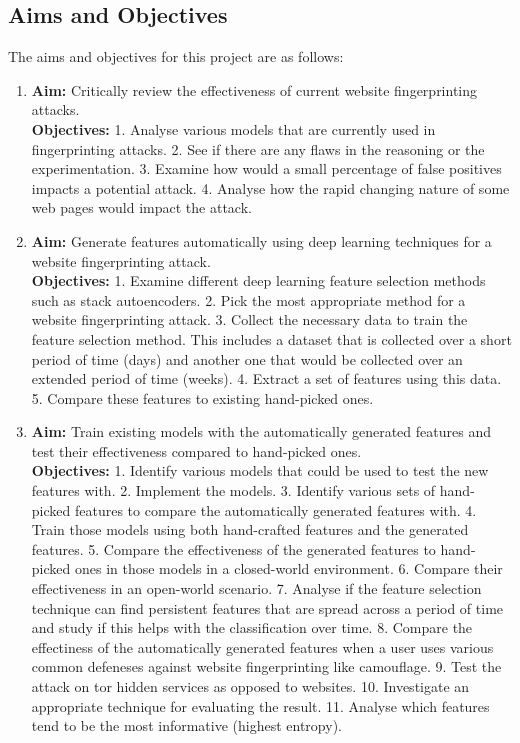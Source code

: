 \subsection{Aims and Objectives}
The aims and objectives for this project are as follows:
  \begin{enumerate}
    \item \label{aim1} \textbf{Aim:} Critically review the effectiveness of current website fingerprinting attacks.\\
    \textbf{Objectives:}
    1. Analyse various models that are currently used in fingerprinting attacks.
    2. See if there are any flaws in the reasoning or the experimentation.
    3. Examine how would a small percentage of false positives impacts a potential attack.
    4. Analyse how the rapid changing nature of some web pages would impact the attack.

    \item \textbf{Aim:} Generate features automatically using deep learning techniques for a website fingerprinting attack.\\
    \textbf{Objectives:}
    1. Examine different deep learning feature selection methods such as stack autoencoders.
    2. Pick the most appropriate method for a website fingerprinting attack.
    3. Collect the necessary data to train the feature selection method. This includes a dataset that is collected over a short period of time (days) and another one that would be collected over an extended period of time (weeks).
    4. Extract a set of features using this data.
    5. Compare these features to existing hand-picked ones.
\newpage
    \item \textbf{Aim:} Train existing models with the automatically generated features and test their effectiveness compared to hand-picked ones.\\
    \textbf{Objectives:}
    1. Identify various models that could be used to test the new features with.
    2. Implement the models.
    3. Identify various sets of hand-picked features to compare the automatically generated features with.
    4. Train those models using both hand-crafted features and the generated features.
    5. Compare the effectiveness of the generated features to hand-picked ones in those models in a closed-world environment.
    6. Compare their effectiveness in an open-world scenario.
    7. Analyse if the feature selection technique can find persistent features that are spread across a period of time and study if this helps with the classification over time.
    8. Compare the effectiness of the automatically generated features when a user uses various common defeneses against website fingerprinting like camouflage.
    9. Test the attack on tor hidden services as opposed to websites.
    10. Investigate an appropriate technique for evaluating the result.
    11. Analyse which features tend to be the most informative (highest entropy).

  \end{enumerate}

